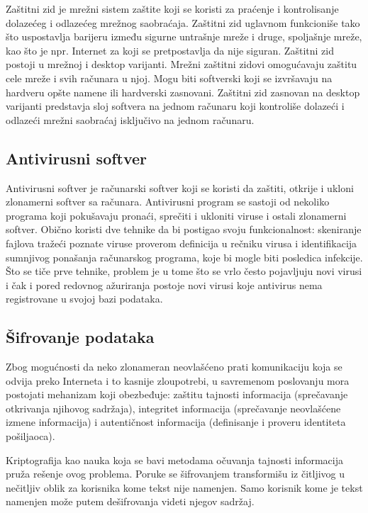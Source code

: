 \documentclass[a4paper]{article}
\begin{document}
Zaštitni zid je mrežni sistem zaštite koji se koristi za praćenje i kontrolisanje dolazećeg i odlazećeg mrežnog saobraćaja. Zaštitni zid uglavnom funkcioniše tako što uspostavlja barijeru između sigurne untrašnje mreže i druge, spoljašnje mreže, kao što je npr. Internet za koji se pretpostavlja da nije siguran.
Zaštitni zid postoji u mrežnoj i desktop varijanti. Mrežni zaštitni zidovi omogućavaju zaštitu cele mreže i svih računara u njoj. Mogu biti softverski koji se izvršavaju na hardveru opšte namene ili hardverski zasnovani.
Zaštitni zid zasnovan na desktop varijanti predstavja sloj softvera na jednom računaru koji kontroliše dolazeći i odlazeći mrežni saobraćaj isključivo na jednom računaru.

\subsection{Antivirusni softver}
\label{subsec:antivirusni softver}

Antivirusni softver je računarski softver koji se koristi da zaštiti, otkrije i ukloni zlonamerni softver sa računara.
Antivirusni program se sastoji od nekoliko programa koji pokušavaju pronaći, sprečiti i ukloniti viruse i ostali zlonamerni softver. Obično koristi dve tehnike da bi postigao svoju funkcionalnost: skeniranje fajlova tražeći poznate viruse proverom definicija u rečniku virusa i identifikacija sumnjivog ponašanja računarskog programa, koje bi mogle biti posledica infekcije. Što se tiče prve tehnike, problem je u tome što se vrlo često pojavljuju novi virusi i čak i pored redovnog ažuriranja postoje novi virusi koje antivirus nema registrovane u svojoj bazi podataka.

\subsection{Šifrovanje podataka}
\label{subsec:sifrovanje podataka}

Zbog mogućnosti da neko zlonameran neovlašćeno prati komunikaciju koja se odvija preko Interneta i to kasnije zloupotrebi, u savremenom poslovanju mora postojati mehanizam koji obezbeđuje:  zaštitu tajnosti informacija (sprečavanje otkrivanja njihovog sadržaja),  integritet informacija (sprečavanje neovlašćene izmene informacija) i autentičnost informacija (definisanje i proveru identiteta pošiljaoca).

Kriptografija kao nauka koja se bavi metodama očuvanja tajnosti informacija pruža rešenje ovog problema. Poruke se šifrovanjem transformišu iz čitljivog u nečitljiv oblik za korisnika kome tekst nije namenjen. Samo korisnik kome je tekst namenjen može putem dešifrovanja videti njegov sadržaj.
\end{document}
